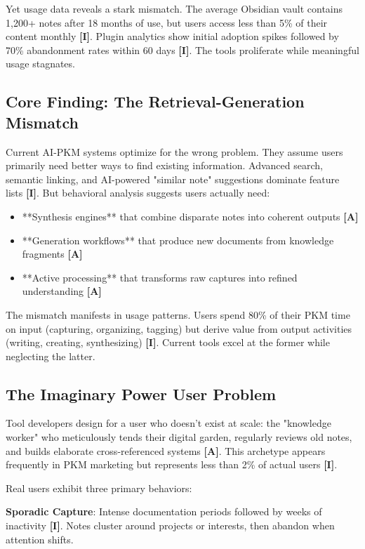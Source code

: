 \documentclass[a4paper,11pt]{article}
\newcommand{\ilabel}{\textbf{\textcolor{icolor}{[I]}}}
\newcommand{\alabel}{\textbf{\textcolor{acolor}{[A]}}}
\begin{document}
Yet usage data reveals a stark mismatch. The average Obsidian vault contains 1,200+ notes after 18 months of use, but users access less than 5\% of their content monthly \ilabel{}. Plugin analytics show initial adoption spikes followed by 70\% abandonment rates within 60 days \ilabel{}. The tools proliferate while meaningful usage stagnates.


\subsection{Core Finding: The Retrieval-Generation Mismatch}

Current AI-PKM systems optimize for the wrong problem. They assume users primarily need better ways to find existing information. Advanced search, semantic linking, and AI-powered "similar note" suggestions dominate feature lists \ilabel{}. But behavioral analysis suggests users actually need:


\begin{itemize}
  \item **Synthesis engines** that combine disparate notes into coherent outputs \alabel{}
  \item **Generation workflows** that produce new documents from knowledge fragments \alabel{}
  \item **Active processing** that transforms raw captures into refined understanding \alabel{}
\end{itemize}

The mismatch manifests in usage patterns. Users spend 80\% of their PKM time on input (capturing, organizing, tagging) but derive value from output activities (writing, creating, synthesizing) \ilabel{}. Current tools excel at the former while neglecting the latter.


\subsection{The Imaginary Power User Problem}

Tool developers design for a user who doesn't exist at scale: the "knowledge worker" who meticulously tends their digital garden, regularly reviews old notes, and builds elaborate cross-referenced systems \alabel{}. This archetype appears frequently in PKM marketing but represents less than 2\% of actual users \ilabel{}.


Real users exhibit three primary behaviors:


\textbf{Sporadic Capture}: Intense documentation periods followed by weeks of inactivity \ilabel{}. Notes cluster around projects or interests, then abandon when attention shifts.
\end{document}
